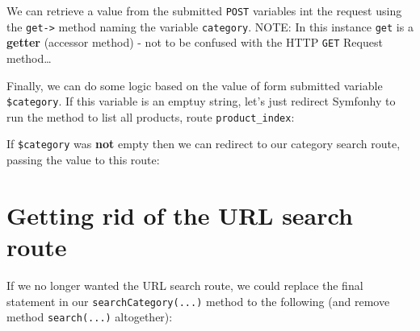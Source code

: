 \documentclass[a4paperpaper,openright]{book}
\newenvironment{Shaded}{}{}
\newcommand{\KeywordTok}[1]{\textcolor[rgb]{0.00,0.44,0.13}{\textbf{#1}}}
\newcommand{\NormalTok}[1]{#1}
\newcommand{\OtherTok}[1]{\textcolor[rgb]{0.00,0.44,0.13}{#1}}
\newcommand{\StringTok}[1]{\textcolor[rgb]{0.25,0.44,0.63}{#1}}
\begin{document}
We can retrieve a value from the submitted \texttt{POST} variables int
the request using the \texttt{get-\textgreater{}} method naming the
variable \texttt{category}. NOTE: In this instance \texttt{get} is a
\textbf{getter} (accessor method) - not to be confused with the HTTP
\texttt{GET} Request method\ldots{}

\begin{Shaded}
\end{Shaded}

Finally, we can do some logic based on the value of form submitted
variable \texttt{\$category}. If this variable is an emptuy string,
let's just redirect Symfonhy to run the method to list all products,
route \texttt{product\_index}:

\begin{Shaded}
\end{Shaded}

If \texttt{\$category} was \textbf{not} empty then we can redirect to
our category search route, passing the value to this route:

\begin{Shaded}
\end{Shaded}

\hypertarget{getting-rid-of-the-url-search-route}{%
\section{Getting rid of the URL search
route}\label{getting-rid-of-the-url-search-route}}

If we no longer wanted the URL search route, we could replace the final
statement in our \texttt{searchCategory(...)} method to the following
(and remove method \texttt{search(...)} altogether):
\end{document}
